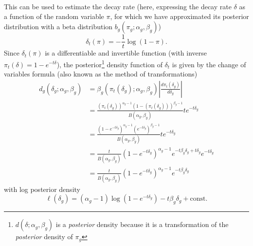 \documentclass[11pt]{article}
\begin{document}
This can be used to estimate the decay rate (here, expressing the decay rate $\delta$ as a function of the random variable $\pi$, for which we have approximated its posterior distribution with a beta distribution $b_g(\pi_g; \alpha_g, \beta_g)$)
$$
\delta_t(\pi) = -\frac{1}{t} \log(1 - \pi).
$$
Since $\delta_t(\pi)$ is a differentiable and invertible function (with inverse $\pi_t(\delta) = 1 - e^{-t \delta}$), the posterior\footnote{$d(\delta; \alpha_g, \beta_g)$ is a \emph{posterior} density because it is a transformation of the \emph{posterior} density of $\pi_g$} density function of $\delta_t$ is given by the change of variables formula (also known as the method of transformations)
$$
\begin{aligned}
d_g(\delta_g; \alpha_g, \beta_g)
&= \beta_g(\pi_t(\delta_g); \alpha_g, \beta_g) \left\lvert \frac{d\pi_t(\delta_g)}{d\delta_g} \right\rvert \\
&= \frac{(\pi_t(\delta_g))^{\alpha_g - 1} (1 - (\pi_t(\delta_g)))^{\beta_g - 1}}{B(\alpha_g, \beta_g)} t e^{-t \delta_g} \\
&= \frac{(1 - e^{-t \delta_g})^{\alpha_g - 1} (e^{-t \delta_g})^{\beta_g - 1}}{B(\alpha_g, \beta_g)} t e^{-t \delta_g} \\
&= \frac{t}{B(\alpha_g, \beta_g)} (1 - e^{-t \delta_g})^{\alpha_g - 1} e^{-t \beta_g \delta_g + t \delta_g} e^{-t \delta_g} \\
&= \frac{t}{B(\alpha_g, \beta_g)} (1 - e^{-t \delta_g})^{\alpha_g - 1} e^{-t \beta_g \delta_g}
\end{aligned}
$$
with log posterior density
$$
\ell(\delta_g) = (\alpha_g - 1) \log(1 - e^{-t \delta_g}) - t \beta_g \delta_g + \text{const}.
$$
\end{document}
